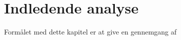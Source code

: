 \chapter{Indledende analyse}
\label{indledende_analyse}
Formålet med dette kapitel er at give en gennemgang af 